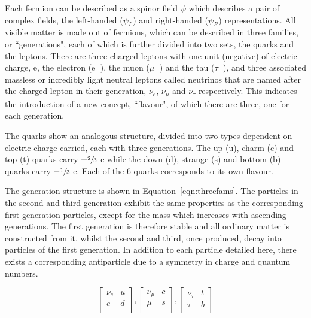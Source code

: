  
Each fermion can be described as a spinor field $\psi$ which describes a pair of complex fields, the left-handed ($\psi_{L}$) and right-handed ($\psi_{R}$) representations. All visible matter is made out of fermions, which can be described in three families, or ``generations", each of which is further divided into two sets, the quarks and the leptons. There are three charged leptons with one unit (negative) of electric charge, e, the electron (e$^{-}$), the muon ($\mu^{-}$) and the tau ($\tau^{-}$), and three associated massless or incredibly light  neutral leptons called neutrinos that are named after the charged lepton in their generation, $\nu_{e}$, $\nu_{\mu}$ and $ \nu_{\tau}$ respectively. This indicates the introduction of a new concept, ``flavour", of which there are three, one for each generation. 

The quarks show an analogous structure, divided into two types dependent on electric charge carried, each with three generations. The up (u), charm (c) and top (t) quarks carry $+\sfrac{2}{3}$ e while the down (d), strange (s) and bottom (b) quarks carry $-\sfrac{1}{3}$ e. Each of the 6 quarks corresponds to its own flavour. 

The generation structure is shown in Equation~\ref{eqn:threefams}. The particles in the second and third generation exhibit the same properties as the corresponding first generation particles, except for the mass which increases with ascending generations. The first generation is therefore stable and all ordinary matter is constructed from it, whilst the second and third, once produced, decay into particles of the first generation. In addition to each particle detailed here, there exists a corresponding antiparticle due to a symmetry in charge and quantum numbers.
 
\begin{equation}
\begin{bmatrix}
\nu_{e} & u \\
e & d \\
\end{bmatrix},
\begin{bmatrix}
\nu_{\mu} & c \\
\mu & s \\
\end{bmatrix},
\begin{bmatrix}
\nu_{\tau} & t \\
\tau & b\\
\end{bmatrix}
\label{eqn:threefams}
\end{equation}

